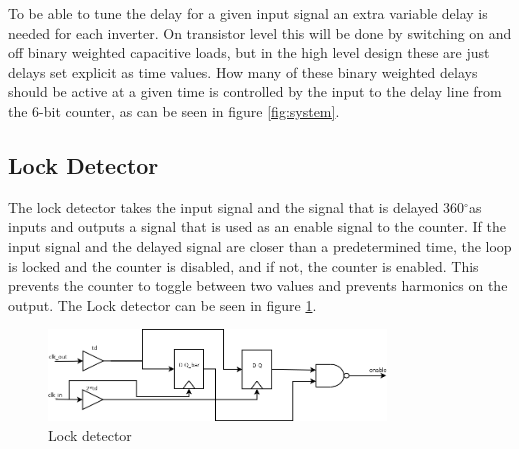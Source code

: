 \documentclass[a4paper,12pt]{article} \usepackage{graphicx}
\newcommand{\degree}{\ensuremath{^\circ}}
\begin{document}
To be able to tune the delay for a given input signal an extra
variable delay is needed for each inverter. On transistor level this
will be done by switching on and off binary weighted capacitive loads,
but in the high level design these are just delays set explicit as time
values. How many of these binary weighted delays should be active at a
given time is controlled by the input to the delay line from the 6-bit
counter, as can be seen in figure \ref{fig:system}. 


\subsection{Lock Detector}
The lock detector takes the input signal and the signal that is delayed 
360\degree   as inputs and outputs a signal that is used as an enable 
signal to the counter. If the input signal and the delayed signal are 
closer than a predetermined time, the loop is locked and the counter
is disabled, and if not, the counter is enabled. This prevents 
the counter to toggle between two values and prevents harmonics on the
output. The Lock detector can be seen in figure \ref{fig:lockdetect}.

\begin{figure}[h!]
        \centering
        \includegraphics[width=0.8\textwidth]{../Bilder/lock_detector_block.png}
        \caption{Lock detector}
        \label{fig:lockdetect}
\end{figure}
\end{document}
